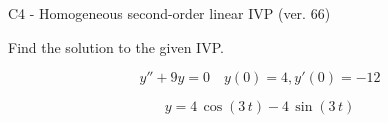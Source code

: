 \begin{exercise}
  \begin{exerciseTitle}C4 - Homogeneous second-order linear IVP (ver. 66)\end{exerciseTitle}
  \begin{exerciseStatement}
    
Find the solution to the given IVP.

    
\[y''+9y = 0 \hspace{1em} y(0) = 4 , y'(0) = -12\]

  \end{exerciseStatement}
  \begin{exerciseAnswer}
    
\[y= 4 \, \cos\left(3 \, t\right) - 4 \, \sin\left(3 \, t\right)\]

  \end{exerciseAnswer}
\end{exercise}